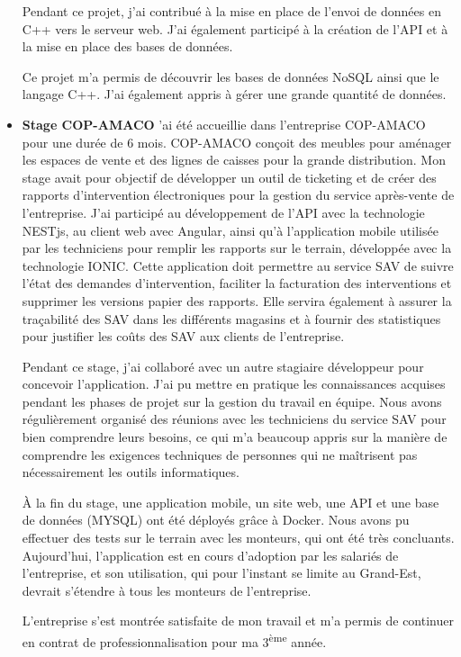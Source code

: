 \documentclass[12pt]{article}
\begin{document}
\begin{itemize}
     \newline Pendant ce projet, j'ai contribué à la mise en place de l'envoi de données en C++ vers le serveur web. J'ai également participé à la création de l'API et à la mise en place des bases de données.

      \newline Ce projet m'a permis de découvrir les bases de données NoSQL ainsi que le langage C++. J'ai également appris à gérer une grande quantité de données.
    \item \textbf{Stage COP-AMACO}
        \newlineJ'ai été accueillie dans l'entreprise COP-AMACO pour une durée de 6 mois. COP-AMACO conçoit des meubles pour aménager les espaces de vente et des lignes de caisses pour la grande distribution. Mon stage avait pour objectif de développer un outil de ticketing et de créer des rapports d'intervention électroniques pour la gestion du service après-vente de l'entreprise. J'ai participé au développement de l'API avec la technologie NESTjs, au client web avec Angular, ainsi qu'à l'application mobile utilisée par les techniciens pour remplir les rapports sur le terrain, développée avec la technologie IONIC. Cette application doit permettre au service SAV de suivre l'état des demandes d'intervention, faciliter la facturation des interventions et supprimer les versions papier des rapports. Elle servira également à assurer la traçabilité des SAV dans les différents magasins et à fournir des statistiques pour justifier les coûts des SAV aux clients de l'entreprise.

        \newline  Pendant ce stage, j'ai collaboré avec un autre stagiaire développeur pour concevoir l'application. J'ai pu mettre en pratique les connaissances acquises pendant les phases de projet sur la gestion du travail en équipe. Nous avons régulièrement organisé des réunions avec les techniciens du service SAV pour bien comprendre leurs besoins, ce qui m'a beaucoup appris sur la manière de comprendre les exigences techniques de personnes qui ne maîtrisent pas nécessairement les outils informatiques.

        \newline À la fin du stage, une application mobile, un site web, une API et une base de données (MYSQL) ont été déployés grâce à Docker. Nous avons pu effectuer des tests sur le terrain avec les monteurs, qui ont été très concluants. Aujourd'hui, l'application est en cours d'adoption par les salariés de l'entreprise, et son utilisation, qui pour l'instant se limite au Grand-Est, devrait s'étendre à tous les monteurs de l'entreprise.

        \newline L'entreprise s'est montrée satisfaite de mon travail et m'a permis de continuer en contrat de professionnalisation pour ma 3\textsuperscript{ème} année.
    
    
\end{itemize}
\end{document}
